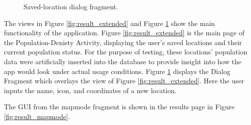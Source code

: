 \begin{figure}
\begin{minipage}{.5\textwidth}
      \caption{Saved-location dialog fragment.}
      \label{fig:result_add}
    \end{minipage}
\end{figure}

The views in Figure \ref{fig:result_extended} and Figure \ref{fig:result_add} show the main functionality of the application. Figure \ref{fig:result_extended} is the main page of the Population-Denisty Activity, displaying the user's saved locations and their current population status. For the purpose of testing, these locations' population data were artificially inserted into the database to provide insight into how the app would look under actual usage conditions. Figure \ref{fig:result_add} displays the Dialog Fragment which overlays the view of Figure \ref{fig:result_extended}. Here the user inputs the name, icon, and coordinates of a new location.

The GUI from the mapmode fragment is shown in the results page in Figure \ref{fig:result_mapmode}.


